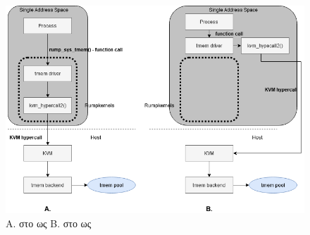 \begin{figure}[h]
  \includegraphics[width=\textwidth]{pictures/sys-func_diff.png}
  \caption{A. στο  ως 
   Β.  στο  ως }
  \label{fig:syscall_funcall}
\end{figure}
